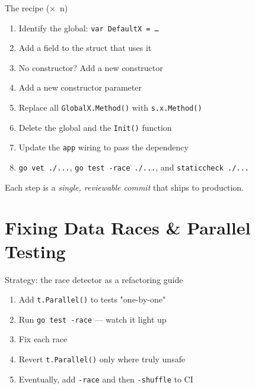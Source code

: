 \documentclass[aspectratio=169,11pt]{beamer}
\begin{document}
\begin{frame}{The recipe ($\times$\ n)}
  \begin{enumerate}
    \setlength\itemsep{6pt}
    \item Identify the global: \texttt{var DefaultX = \ldots}
    \item Add a field to the struct that uses it
    \item No constructor? Add a new constructor
    \item Add a new constructor parameter
    \item Replace all \texttt{GlobalX.Method()} with \texttt{s.x.Method()}
    \item Delete the global and the \texttt{Init()} function
    \item Update the \texttt{app} wiring to pass the dependency
    \item \texttt{go vet ./...}, \texttt{go test -race ./...}, and \texttt{staticcheck ./...}
  \end{enumerate}

  \vspace{6pt}
  Each step is a \emph{single, reviewable commit} that ships to production.
\end{frame}

\section{Fixing Data Races \& Parallel Testing}

\begin{frame}{Strategy: the race detector as a refactoring guide}
  \begin{enumerate}
    \setlength\itemsep{6pt}
    \item Add \texttt{t.Parallel()} to tests "one-by-one"
    \item Run \texttt{go test -race} --- watch it light up
    \item Fix each race
    \item Revert \texttt{t.Parallel()} only where truly unsafe
    \item Eventually, add \texttt{-race} and then \texttt{-shuffle} to CI
  \end{enumerate}
\end{frame}
\end{document}
